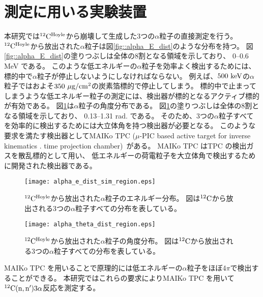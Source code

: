 \documentclass[../master]{subfiles}
\begin{document}
\section{測定に用いる実験装置}
\label{seq::detector_using_experiment}
本研究では${}^{12}{\rm C}^{\rm Hoyle}$から崩壊して生成した3つの$\alpha$粒子の直接測定を行う。
${}^{12}{\rm C}^{\rm Hoyle}$から放出された$\alpha$粒子は図\ref{fig::alpha_E_dist}のような分布を持つ。
図\ref{fig::alpha_E_dist}の塗りつぶしは全体の8割となる領域を示しており、
0--0.6 MeV である。
このような低エネルギーの$\alpha$粒子を効率よく検出するためには、
標的中で$\alpha$粒子が停止しないようにしなければならない。
例えば、$500~{\rm keV}$の$\alpha$粒子ではおよそ$350~{\rm \mu g/cm^2}$の炭素箔標的で停止してしまう。
標的中で止まってしまうような低エネルギー粒子の測定には、検出器が標的となるアクティブ標的が有効である。
図\ref{fig::alpha_theta_dist}は$\alpha$粒子の角度分布である。
図\ref{fig::alpha_theta_dist}の塗りつぶしは全体の8割となる領域を示しており、
0.13--1.31 rad. である。
そのため、3つの$\alpha$粒子すべてを効率的に検出するためには大立体角を持つ検出器が必要となる。
このような要求を満たす検出器としてMAIKo TPC ($\mu$-PIC based active target for inverse kinematics .
time projection chamber)~\cite{maiko, mupic}がある。
MAIKo TPC はTPC の検出ガスを散乱標的として用い、
低エネルギーの荷電粒子を大立体角で検出するために開発された検出器である。
\begin{figure}
  \centering
  \texttt{[image: alpha\_e\_dist\_sim\_region.eps]}
  \caption[${}^{12}{\rm C}^{\rm Hoyle}$から放出された$\alpha$粒子のエネルギー分布。]
          {${}^{12}{\rm C}^{\rm Hoyle}$から放出された$\alpha$粒子のエネルギー分布。
            図は${}^{12}{\rm C}$から放出される3つの$\alpha$粒子すべての分布を表している。}
  \label{fig::alpha_E_dist}
  \texttt{[image: alpha\_theta\_dist\_region.eps]}
  \caption[${}^{12}{\rm C}^{\rm Hoyle}$から放出された$\alpha$粒子の角度分布。]
          {${}^{12}{\rm C}^{\rm Hoyle}$から放出された$\alpha$粒子の角度分布。
            図は${}^{12}{\rm C}$から放出される3つの$\alpha$粒子すべての分布を表している。
          }
  \label{fig::alpha_theta_dist}
\end{figure}
MAIKo TPC を用いることで原理的には低エネルギーの$\alpha$粒子をほぼ4$\pi$で検出することができる。
本研究ではこれらの要求によりMAIKo TPC を用いて${}^{12}{\rm C}({\rm n},{\rm n}')3\alpha$反応を測定する。
\end{document}
